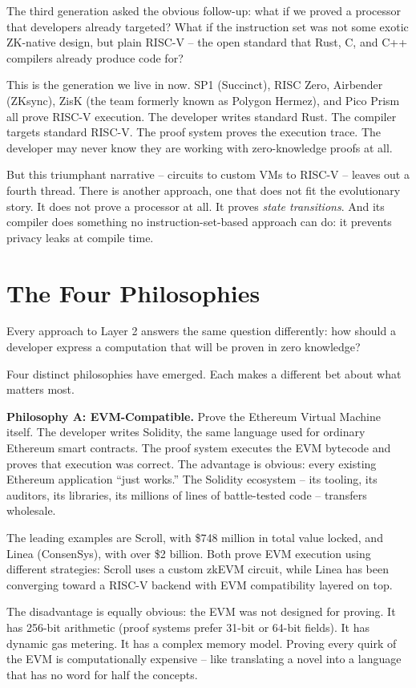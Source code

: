 \documentclass[
  11pt,
  openany]{report}
\renewcommand{\textbf}[1]{{\bfseries\color{MidnightBold}#1}}
\begin{document}
The third generation asked the obvious follow-up: what if we proved a processor
that developers already targeted? What if the instruction set was not some
exotic ZK-native design, but plain RISC-V -- the open standard that Rust, C, and
C++ compilers already produce code for?

This is the generation we live in now. SP1 (Succinct), RISC Zero, Airbender
(ZKsync), ZisK (the team formerly known as Polygon Hermez), and Pico Prism all
prove RISC-V execution. The developer writes standard Rust. The compiler targets
standard RISC-V. The proof system proves the execution trace. The developer may
never know they are working with zero-knowledge proofs at all.

But this triumphant narrative -- circuits to custom VMs to RISC-V -- leaves out
a fourth thread. There is another approach, one that does not fit the
evolutionary story. It does not prove a processor at all. It proves \emph{state
transitions}. And its compiler does something no instruction-set-based approach
can do: it prevents privacy leaks at compile time.

\section{The Four Philosophies}\label{the-four-philosophies}

Every approach to Layer 2 answers the same question differently: how should a
developer express a computation that will be proven in zero knowledge?

Four distinct philosophies have emerged. Each makes a different bet about what
matters most.

\textbf{Philosophy A: EVM-Compatible.} Prove the Ethereum Virtual Machine
itself. The developer writes Solidity, the same language used for ordinary
Ethereum smart contracts. The proof system executes the EVM bytecode and proves
that execution was correct. The advantage is obvious: every existing Ethereum
application ``just works.'' The Solidity ecosystem -- its tooling, its auditors,
its libraries, its millions of lines of battle-tested code -- transfers
wholesale.

The leading examples are Scroll, with \$748 million in total value locked, and
Linea (ConsenSys), with over \$2 billion. Both prove EVM execution using
different strategies: Scroll uses a custom zkEVM circuit, while Linea has been
converging toward a RISC-V backend with EVM compatibility layered on top.

The disadvantage is equally obvious: the EVM was not designed for proving. It
has 256-bit arithmetic (proof systems prefer 31-bit or 64-bit fields). It has
dynamic gas metering. It has a complex memory model. Proving every quirk of the
EVM is computationally expensive -- like translating a novel into a language
that has no word for half the concepts.
\end{document}
